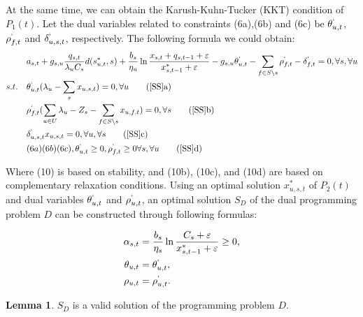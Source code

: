 \documentclass[journal,article,submit,pdftex,moreauthors]{Definitions/mdpi}
\begin{document}
At the same time, we can obtain the Karush-Kuhn-Tucker (KKT) condition of $P_1(t)$. Let the dual variables related to constraints (6a),(6b) and (6c) be $\theta_{u,t}^{`}$, $\rho_{f,t}^{`}$ and $\delta_{u,s,t}^{`}$,  respectively. The following formula we could obtain:
\begin{align}
&a_{s,t}+g_{s,u}\frac{q_{s,t}}{\lambda_u C_s}d(s_{u,t}^{*},s)+\frac{b_s}{\eta_u}\ln \frac{x_{s,t}+q_{s,t-1}+\varepsilon}{x_{s,t-1}^{*}+\varepsilon}-g_{s,u}\theta_{u,t}^{`}-\sum_{f\in S \backslash s} \rho_{f,t}^{`}-\delta_{f,t}^{`}=0, \forall s, \forall u  \label{SS}\\
s.t.\quad
&\theta_{u,t}^{`}(\lambda_u-\sum_{s}x_{u,s,t})=0, \forall u \tag{\ref{SS}{a}} \label{SSa}\\
&\rho_{f,t}^{`}(\sum_{u\in U}\lambda_u-Z_s-\sum_{f\in S \backslash s}x_{u,f,t})=0, \forall s \tag{\ref{SS}{b}} \label{SSb}\\
&\delta_{u,s,t}^{`}x_{u,s,t}=0, \forall u ,\forall s \tag{\ref{SS}{c}} \label{SSc}\\
&(6a)(6b)(6c), \theta_{u,t}^{`}\ge 0, \rho_{f,t}^{`}\ge 0 \forall s , \forall u  \tag{\ref{SS}{d}} \label{SSd}
\end{align}

Where (10) is based on stability, and  (10b), (10c), and (10d) are based on complementary relaxation conditions. Using an optimal solution $x_{u,s,t}^{*}$ of $P_2(t)$ and dual variables $\theta_{u,t}^{`}$ and $\rho_{u,t}^{`}$,  an optimal solution $S_D$ of the dual programming problem $D$ can be constructed through  following formulas:

\begin{align*}
\alpha_{s,t}&=\frac{b_s}{\eta_s}\ln \frac{C_s+\varepsilon}{x_{s,t-1}^{*}+\varepsilon}\ge 0 ,\\
\theta_{u,t}&=\theta_{u,t}^{`},\\
\rho_{u,t}&=\rho_{u,t}^{`}.
\end{align*}

\textbf{Lemma 1}. $S_D$ is a valid solution of the programming problem $D$.
\end{document}
